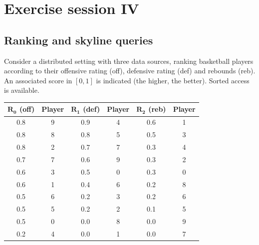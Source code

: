 \documentclass[12pt, a4paper]{report}
\begin{document}
    \newpage 

    \chapter{Exercise session IV}
    \section{Ranking and skyline queries}
        Consider a distributed setting with three data sources, ranking basketball players according to their offensive rating (off), defensive rating (def) and rebounds (reb).
        An associated score in $[0,1]$ is indicated (the higher, the better). Sorted access is available.
        \begin{table}[H]
            \centering
            \begin{tabular}{|cc|cc|cc|}
            \hline
            $\boldsymbol{R_0}$ \textbf{(off)} & \textbf{Player} & $\boldsymbol{R_1}$ \textbf{(def)} & \textbf{Player} & $\boldsymbol{R_2}$ \textbf{(reb)} & \textbf{Player} \\ \hline
            0.8         & 9      & 0.9         & 4      & 0.6         & 1      \\
            0.8         & 8      & 0.8         & 5      & 0.5         & 3      \\
            0.8         & 2      & 0.7         & 7      & 0.3         & 4      \\
            0.7         & 7      & 0.6         & 9      & 0.3         & 2      \\
            0.6         & 3      & 0.5         & 0      & 0.3         & 0      \\
            0.6         & 1      & 0.4         & 6      & 0.2         & 8      \\
            0.5         & 6      & 0.2         & 3      & 0.2         & 6      \\
            0.5         & 5      & 0.2         & 2      & 0.1         & 5      \\
            0.5         & 0      & 0.0         & 8      & 0.0         & 9      \\
            0.2         & 4      & 0.0         & 1      & 0.0         & 7      \\ \hline
            \end{tabular}
        \end{table}
\end{document}
